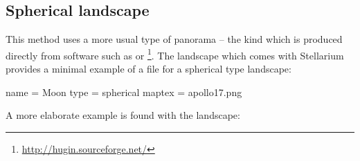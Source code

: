 \subsection{Spherical landscape}
\label{sec:landscapes:Spherical}

This method uses a more usual type of panorama -- the kind which is
produced directly from software such as  or
\footnote{\url{http://hugin.sourceforge.net/}}.  The
 landscape which comes with Stellarium provides a
minimal example of a  file for a spherical type
landscape:

\begin{configfile}
[landscape]
name = Moon
type = spherical
maptex = apollo17.png
\end{configfile}
A more elaborate example is found with the  landscape: 

